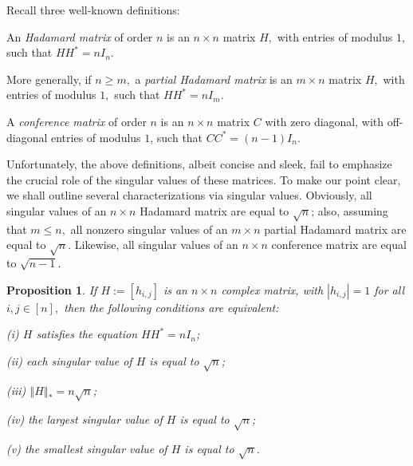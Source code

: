 \documentclass[12pt]{article}%
\newtheorem{proposition}[theorem]{Proposition}
\begin{document}
Recall three well-known definitions:\emph{ \medskip}

An \emph{Hadamard matrix} of order $n$ is an $n\times n$ matrix $H,$ with
entries of modulus $1,$ such that $HH^{\ast}=nI_{n}.$

More generally, if $n\geq m,$ a \emph{partial Hadamard matrix} is an $m\times
n$ matrix $H,$ with entries of modulus $1,$ such that $HH^{\ast}=nI_{m}.$

A \emph{conference matrix} of order $n$ is an $n\times n$ matrix $C$ with zero
diagonal, with off-diagonal entries of modulus $1$, such that $CC^{\ast
}=\left(  n-1\right)  I_{n}.$\medskip

Unfortunately, the above definitions, albeit concise and sleek, fail to
emphasize the crucial role of the singular values of these matrices. To make
our point clear, we shall outline several characterizations via singular
values. Obviously, all singular values of an $n\times n$ Hadamard matrix are
equal to $\sqrt{n}$; also, assuming that $m\leq n,$ all nonzero singular
values of an $m\times n$ partial Hadamard matrix are equal to $\sqrt{n}.$
Likewise, all singular values of an $n\times n$ conference matrix are equal to
$\sqrt{n-1}.$

\begin{proposition}
\label{pro1}If $H:=\left[  h_{i,j}\right]  $ is an $n\times n$ complex matrix,
with $\left\vert h_{i,j}\right\vert =1$ for all $i,j\in\left[  n\right]  ,$
then the following conditions are equivalent:

(i) $H$ satisfies the equation $HH^{\ast}=nI_{n}$;

(ii) each singular value of $H$ is equal to $\sqrt{n}$;

(iii) $\left\Vert H\right\Vert _{\ast}=n\sqrt{n}$;

(iv) the largest singular value of $H$ is equal to $\sqrt{n}$;

(v) the smallest singular value of $H$ is equal to $\sqrt{n}.$
\end{proposition}
\end{document}
